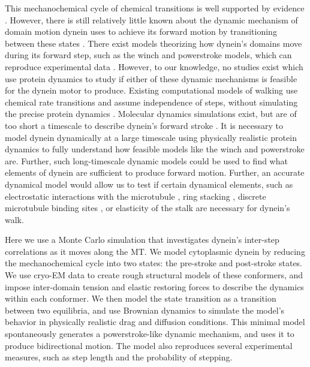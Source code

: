 \documentclass[9pt,twocolumn,twoside]{article}
\begin{document}
This mechanochemical cycle of chemical transitions is well supported by evidence \cite{citemore}. However, there is still relatively little known about the dynamic mechanism of domain motion dynein uses to achieve its forward motion by transitioning between these states \cite{lippert}. There exist models theorizing how dynein's domains move during its forward step, such as the winch \cite{} and powerstroke \cite{} models, which can reproduce experimental data \cite{}. However, to our knowledge, no studies exist which use protein dynamics to study if either of these dynamic mechanisms is feasible for the dynein motor to produce. Existing computational models of walking use chemical rate transitions and assume independence of steps, without simulating the precise protein dynamics \cite{}. Molecular dynamics simulations exist, but are of too short a timescale to describe dynein's forward stroke \cite{}. It is necessary to model dynein dynamically at a large timescale using physically realistic protein dynamics to fully understand how feasible models like the winch and powerstroke are. Further, such long-timescale dynamic models could be used to find what elements of dynein are sufficient to produce forward motion. Further, an accurate dynamical model would allow us to test if certain dynamical elements, such as electrostatic interactions with the microtubule \cite{longrangemt}, ring stacking \cite{sarlahmodel}, discrete microtubule binding sites \cite{trottmodel}, or elasticity of the stalk \cite{burgess-paper} are necessary for dynein's walk.

Here we use a Monte Carlo simulation that investigates dynein's inter-step correlations as it moves along the MT. We model cytoplasmic dynein by reducing the mechanochemical cycle into two states: the pre-stroke and post-stroke states. We use cryo-EM data to create rough structural models of these conformers, and impose inter-domain tension and elastic restoring forces to describe the dynamics within each conformer. We then model the state transition as a transition between two equilibria, and use Brownian dynamics to simulate the model's behavior in physically realistic drag and diffusion conditions. This minimal model spontaneously generates a powerstroke-like dynamic mechanism, and uses it to produce bidirectional motion. The model also reproduces several experimental measures, such as step length and the probability of stepping. 
\end{document}
